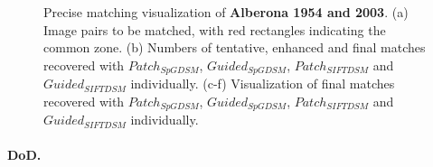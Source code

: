 \begin{figure}[htbp]
\begin{center}
{\begin{minipage}[t]{0.48\linewidth}
			\end{minipage}%
		}
		\caption{Precise matching visualization of \textbf{Alberona 1954 and 2003}. (a) Image pairs to be matched, with red rectangles indicating the common zone. (b) Numbers of tentative, enhanced and final matches recovered with $Patch_{SpGDSM}$, $Guided_{SpGDSM}$, $Patch_{SIFTDSM}$ and $Guided_{SIFTDSM}$ individually. (c-f) Visualization of final matches recovered with $Patch_{SpGDSM}$, $Guided_{SpGDSM}$, $Patch_{SIFTDSM}$ and $Guided_{SIFTDSM}$ individually.}
		\label{MatchVizAlberona}
	\end{center}
\end{figure} 


\paragraph{\ac{DoD}.}

